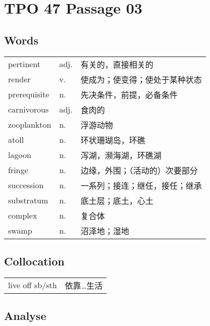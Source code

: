 \section{TPO 47 Passage 03}

\subsection{Words}

\begin{tabular}{lll}
    pertinent    & adj. & 有关的，直接相关的       \\
    render       & v.   & 使成为；使变得；使处于某种状态 \\
    prerequisite & n.   & 先决条件，前提，必备条件    \\
    carnivorous  & adj. & 食肉的             \\
    zooplankton  & n.   & 浮游动物            \\
    atoll        & n.   & 环状珊瑚岛，环礁        \\
    lagoon       & n.   & 泻湖，濒海湖，环礁湖      \\
    fringe       & n.   & 边缘，外围；（活动的）次要部分 \\
    succession   & n.   & 一系列；接连；继任，接任；继承 \\
    substratum   & n.   & 底土层；底土，心土       \\
    complex      & n.   & 复合体             \\
    swamp        & n.   & 沼泽地；湿地          \\
\end{tabular}

\subsection{Collocation}

\begin{tabular}{ll}
    live off sb/sth & 依靠…生活 \\
\end{tabular}

\subsection{Analyse}

